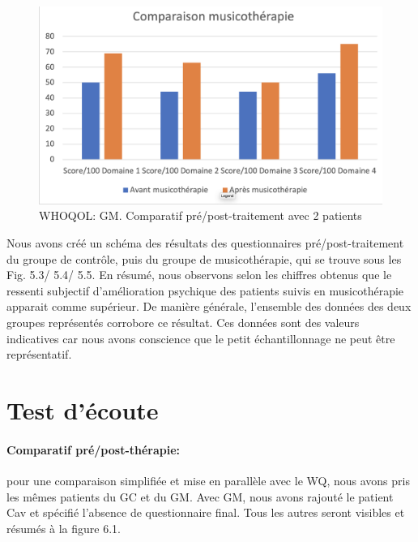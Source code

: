  \begin{figure}[th]
 	\centering
 	\includegraphics[width=1.0\linewidth]{images/Compmusico.png}
 	\caption[Schéma du déroulement]{ WHOQOL: GM. Comparatif pré/post-traitement avec 2 patients}
 	
 \end{figure}
 
 
 Nous avons créé un schéma des résultats des questionnaires
 pré/post-traitement du groupe de contrôle, puis du groupe de musicothérapie,
 qui  se trouve sous les Fig. 5.3/ 5.4/ 5.5.
 En résumé, nous observons selon les chiffres obtenus que  le ressenti
 subjectif d'amélioration psychique
 des patients suivis en musicothérapie apparait comme
 supérieur.
 De manière générale, l'ensemble des données des deux groupes représentés
 corrobore ce résultat.
 Ces données sont des valeurs indicatives car nous avons conscience que le petit échantillonnage ne
 peut être représentatif.

 
 \clearpage

 \section{Test d'écoute}
  \paragraph{Comparatif pré/post-thérapie:}
 pour une comparaison simplifiée et mise en parallèle avec le WQ, nous avons pris les mêmes   
 patients du GC et du GM. Avec GM, nous avons rajouté  le patient Cav et spécifié l'absence de 
 questionnaire final.
 Tous les autres seront visibles et résumés à la figure 6.1.
